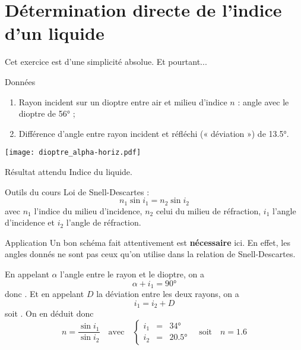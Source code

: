\documentclass[a4paper, 12pt, final, garamond]{book}
\begin{document}
\section{Détermination directe de l'indice d'un liquide}
Cet exercice est d'une simplicité absolue. Et pourtant...
\begin{tcbraster}[raster columns=5, raster equal height=rows]
    \begin{NCdefi}[raster multicolumn=3, sidebyside, righthand width=4cm]{Données}
        \begin{enumerate}
            \item Rayon incident sur un dioptre entre air et milieu d'indice $n$ :
                angle {\huge avec le dioptre} de \ang{56;;} ;
            \item Différence d'angle entre rayon incident et réfléchi (« déviation
                ») de \ang{13.5;;}.
        \end{enumerate}
        \tcblower
        \begin{center}
            \texttt{[image: dioptre\_alpha-horiz.pdf]}
        \end{center}
    \end{NCdefi}    
    \begin{tcolorbox}[blankest, raster multicolumn=2, space to=\myspace]
        \begin{tcbraster}[raster columns=1]
            \begin{NCprop}[add to natural height=\myspace]{Résultat attendu}
                Indice du liquide.
            \end{NCprop}
            \begin{NCrapp}{Outils du cours}
                Loi de Snell-Descartes :
                \[ n_1\sin i_1 = n_2 \sin i_2 \]
                avec $n_1$ l'indice du milieu d'incidence, $n_2$ celui du milieu
                de réfraction, $i_1$ l'angle d'incidence et $i_2$ l'angle de
                réfraction.
            \end{NCrapp}
        \end{tcbraster}
    \end{tcolorbox}
\end{tcbraster}

\begin{NCexem}{Application}
    Un bon schéma fait attentivement est \textbf{nécessaire} ici. En effet,
    les angles donnés ne sont pas ceux qu'on utilise dans la relation de
    Snell-Descartes. \bigbreak
    
    En appelant $\alpha$ l'angle entre le rayon et le dioptre, on a
    \[ \alpha + i_1 = \ang{90;;}\]
    donc . Et en appelant $D$ la déviation entre
    les deux rayons, on a
    \[ i_1 = i_2 + D\]
    soit . On en déduit donc
    \[\boxed{n = \frac{\sin i_1}{\sin i_2}} \quad \text{avec} \quad
        \left\{
            \begin{array}{rcl}
                i_1 & = & \ang{34;;}\\
                i_2 & = & \ang{20.5;;}
            \end{array}
    \right. \quad \text{soit} \quad \boxed{n = 1.6}
    \]
\end{NCexem}
\end{document}
